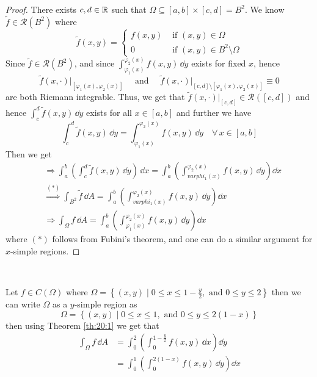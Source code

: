 \documentclass[../Analysis-3.tex]{subfiles}
\begin{document}
\begin{proof}
  There exists $c,d \in \mathbb{R}$ such that $\Omega \subseteq [a,b] \times [c,d] = B^2$. We know $\tilde{f} \in \mathscr{R}(B^2)$ where
  \[
    \tilde{f}(x,y) = \begin{cases}
      f(x,y) & \mbox{ if } (x,y) \in \Omega               \\
      0      & \mbox{ if } (x,y) \in B^2 \setminus \Omega
    \end{cases}
  \]
  Since $\tilde{f} \in \mathscr{R}(B^2)$, and since $\displaystyle{\int_{\varphi_1(x)}^{\varphi_2(x)} f(x,y) \, \dd y}$ exists for fixed $x$, hence
  \[
    \tilde{f}(x,\cdot)\big\vert_{[\varphi_1(x),\varphi_2(x)]} \quad \mbox{ and } \quad \tilde{f}(x,\cdot)\big\vert_{[c,d]\setminus[\varphi_1(x),\varphi_2(x)]} \equiv 0
  \]
  are both Riemann integrable. Thus, we get that $\tilde{f}(x,\cdot)\vert_{[c,d]} \in \mathscr{R}([c,d])$ and hence $\displaystyle{\int_c^d \tilde{f}(x,y) \, \dd y}$ exists for all $x \in [a,b]$ and further we have
  \[
    \int_c^d \tilde{f}(x,y) \, \dd y = \int_{\varphi_1(x)}^{\varphi_2(x)} f(x,y) \, \dd y \quad \forall \, x \in [a,b]
  \]
  Then we get
  \begin{align*}
     & \Longrightarrow \int_a^b \left( \int_c^d \tilde{f}(x,y) \, \dd y\right)\, \dd x = \int_a^b \left( \int_{varphi_1(x)}^{\varphi_2(x)} f(x,y) \, \dd y\right) \dd x \\
     & \overset{(*)}{\Longrightarrow} \int_{B^2} \tilde{f} \, \dd A = \int_a^b \left( \int_{varphi_1(x)}^{\varphi_2(x)} f(x,y) \, \dd y\right) \dd x                    \\
     & \Longrightarrow \int_{\Omega} f \, \dd A = \int_a^b \left( \int_{\varphi_1(x)}^{\varphi_2(x)} f(x,y) \, \dd y\right) \dd x
  \end{align*}
  where $(*)$ follows from Fubini's theorem, and one can do a similar argument for $x$-simple regions.
\end{proof}

\

\begin{Eg}{}{}
  Let $f \in C(\Omega)$ where $\Omega = \left\{ (x,y) \mid 0 \leq x \leq 1 - \frac{y}{2}, \mbox{ and } 0 \leq y \leq 2 \right\}$ then we can write $\Omega$ as a $y$-simple region as
  \[
    \Omega = \left\{ (x,y) \mid 0 \leq x \leq 1, \mbox{ and } 0 \leq y \leq 2(1-x) \right\}
  \]
  then using Theorem \ref{th:20:1} we get that
  \begin{align*}
    \int_{\Omega} f \, \dd A
     & = \int_0^2 \left( \int_0^{1-\frac{y}{2}} f(x,y) \, \dd x\right) \dd y \\
     & = \int_0^1 \left( \int_0^{2(1-x)} f(x,y) \, \dd y\right) \dd x
  \end{align*}
\end{Eg}
\end{document}
